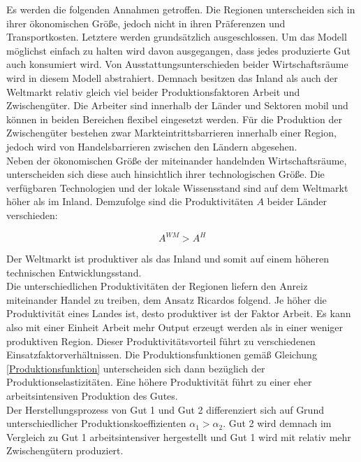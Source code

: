 Es werden die folgenden Annahmen getroffen. Die Regionen unterscheiden sich in ihrer ökonomischen Größe, jedoch nicht in ihren Präferenzen und Transportkosten. Letztere  werden grundsätzlich ausgeschlossen. Um das Modell möglichst einfach zu halten wird davon ausgegangen, dass jedes produzierte Gut auch konsumiert wird. Von Ausstattungsunterschieden beider Wirtschaftsräume wird in diesem Modell abstrahiert. Demnach besitzen das Inland als auch der Weltmarkt relativ gleich viel beider Produktionsfaktoren Arbeit und Zwischengüter. Die Arbeiter sind innerhalb der Länder und Sektoren mobil und können in beiden Bereichen flexibel eingesetzt werden. Für die Produktion der Zwischengüter bestehen zwar Markteintrittsbarrieren innerhalb einer Region, jedoch wird von Handelsbarrieren zwischen den Ländern abgesehen.\\


Neben der ökonomischen Größe der miteinander handelnden Wirtschaftsräume, unterscheiden sich diese auch hinsichtlich ihrer technologischen Größe. Die verfügbaren Technologien und der lokale Wissensstand sind auf dem Weltmarkt höher als im Inland. Demzufolge sind die Produktivitäten $A$ beider Länder verschieden:


	\begin{equation}
		A^{WM}>A^{H}\label{verschiedene A}
	\end{equation}	


Der Weltmarkt ist produktiver als das Inland und somit auf einem höheren technischen Entwicklungsstand.\\
Die unterschiedlichen Produktivitäten der Regionen liefern den Anreiz miteinander Handel zu treiben, dem Ansatz Ricardos folgend. Je höher die Produktivität eines Landes ist, desto produktiver ist der Faktor Arbeit. Es kann also mit einer Einheit Arbeit mehr Output erzeugt werden als in einer weniger produktiven Region. Dieser Produktivitätsvorteil führt zu verschiedenen Einsatzfaktorverhältnissen. Die Produktionsfunktionen gemäß Gleichung \eqref{Produktionsfunktion} unterscheiden sich dann bezüglich der Produktionselastizitäten. Eine höhere Produktivität führt zu einer eher arbeitsintensiven Produktion des Gutes.\\  
Der Herstellungsprozess von Gut 1 und Gut 2 differenziert sich auf Grund unterschiedlicher Produktionskoeffizienten $\alpha_1 >\alpha_2$. Gut 2 wird demnach im Vergleich zu Gut 1 arbeitsintensiver hergestellt und Gut 1 wird mit relativ mehr Zwischengütern produziert.\\


